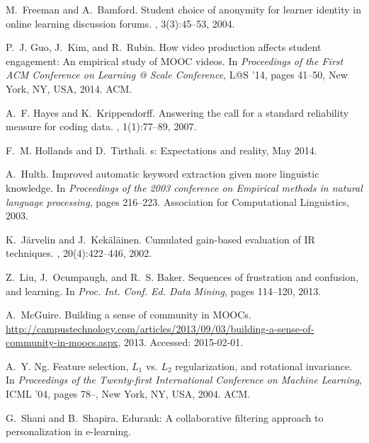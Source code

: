 \documentclass{edm_template}
\begin{document}
\begin{thebibliography}{10}
M.~Freeman and A.~Bamford.
\newblock Student choice of anonymity for learner identity in online learning
  discussion forums.
, 3(3):45--53, 2004.

P.~J. Guo, J.~Kim, and R.~Rubin.
\newblock How video production affects student engagement: An empirical study
  of {MOOC} videos.
\newblock In {\em Proceedings of the First ACM Conference on Learning @ Scale
  Conference}, L@S '14, pages 41--50, New York, NY, USA, 2014. ACM.

A.~F. Hayes and K.~Krippendorff.
\newblock Answering the call for a standard reliability measure for coding
  data.
, 1(1):77--89, 2007.

F.~M. Hollands and D.~Tirthali.
s: Expectations and reality, May 2014.

A.~Hulth.
\newblock Improved automatic keyword extraction given more linguistic
  knowledge.
\newblock In {\em Proceedings of the 2003 conference on Empirical methods in
  natural language processing}, pages 216--223. Association for Computational
  Linguistics, 2003.

K.~J{\"a}rvelin and J.~Kek{\"a}l{\"a}inen.
\newblock Cumulated gain-based evaluation of {IR} techniques.
, 20(4):422--446,
  2002.

Z.~Liu, J.~Ocumpaugh, and R.~S. Baker.
\newblock Sequences of frustration and confusion, and learning.
\newblock In {\em Proc. Int. Conf. Ed. Data Mining}, pages 114--120, 2013.

A.~McGuire.
\newblock Building a sense of community in {MOOC}s.
\newblock
  \url{http://campustechnology.com/articles/2013/09/03/building-a-sense-of-community-in-moocs.aspx},
  2013.
\newblock Accessed: 2015-02-01.

A.~Y. Ng.
\newblock Feature selection, {$L_{1}$} vs. {$L_{2}$} regularization, and
  rotational invariance.
\newblock In {\em Proceedings of the Twenty-first International Conference on
  Machine Learning}, ICML '04, pages 78--, New York, NY, USA, 2004. ACM.

G.~Shani and B.~Shapira.
\newblock Edurank: A collaborative filtering approach to personalization in
  e-learning.


\end{thebibliography}
\end{document}
